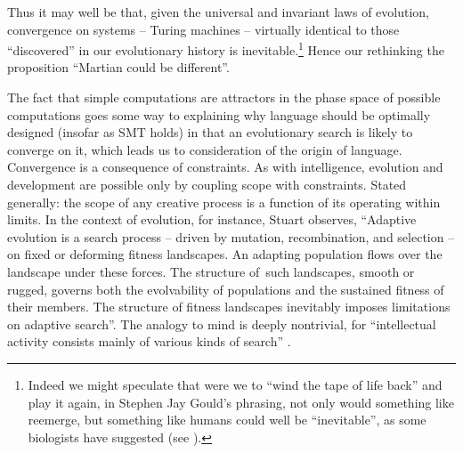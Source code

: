 \documentclass[output=paper]{langsci/langscibook}
\begin{document}
Thus it may well be that, given the universal and invariant laws of evolution,
convergence on systems – Turing machines – virtually identical to those
“discovered” in our evolutionary history is inevitable.\footnote{Indeed we
    might speculate that were we to “wind the tape of life back” and play it
    again, in Stephen Jay Gould’s phrasing, not only would something like 
reemerge, but something like humans could well be “inevitable”, as some
biologists have suggested (see \citealt{ConwayMorris2013}).}  Hence our
rethinking the proposition “Martian could be different”.

The fact that simple computations are attractors in the phase space of possible
computations goes some way to explaining why language should be optimally
designed (insofar as \gls{SMT} holds) in that an evolutionary search is likely to
converge on it, which leads us to consideration of the origin of language.
Convergence is a consequence of constraints. As with intelligence, evolution
and development are possible only by coupling scope with constraints. Stated
generally: the scope of any creative process is a function of its operating
within limits. In the context of evolution, for instance, Stuart
\citet[118]{Kauffman1993} observes, “Adaptive evolution is a search process –
driven by mutation, recombination, and selection – on fixed or deforming
fitness landscapes. An adapting population flows over the landscape under these
forces. The structure of~such landscapes, smooth or rugged, governs both the
evolvability of populations and the sustained fitness of their members. The
structure of fitness landscapes inevitably imposes limitations on adaptive
search”. The analogy to mind is deeply nontrivial, for “intellectual activity
consists mainly of various kinds of search” \citep[431]{Turing1948}.
\end{document}

